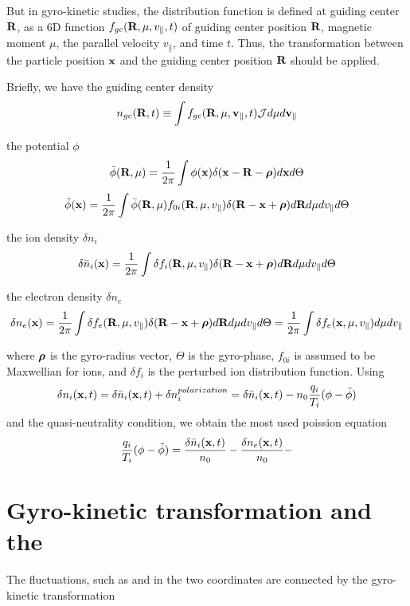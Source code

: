 \documentclass{report}
\newcommand{\bm}[1]{\mbox{\boldmath $#1$}}
\newcommand{\ff}[2]{\frac{#1}{#2}}
\def\R{\mbox{\bf R}}
\def\v{\mbox{\bf v}}
\def\x{\mbox{\bf x}}
\begin{document}
But in gyro-kinetic studies,
the distribution function is defined at guiding center $\R$, as a 6D function
$f_{gc}(\R, \mu, v_\parallel, t)$
of guiding center position $\R$, 
magnetic moment $\mu$, 
the parallel velocity $v_\parallel$,
and time $t$.
Thus, the transformation
between the particle position $\x$ and the guiding center position $\R$
should be applied.

\noindent
Briefly, we have the guiding center density
$$
n_{gc}(\R, t) \equiv \int f_{gc}(\R, \mu, \v_\parallel, t) \mathcal{J} d\mu d\v_\parallel
$$

\noindent
the potential $\phi$
$$
\bar{\phi}(\R, \mu)=\ff{1}{2\pi} \int \phi(\x) \delta(\x - \R - \bm{\rho}) d\x d\Theta
$$
$$
\tilde{\phi}(\x) = \ff{1}{2\pi} \int \bar{\phi}(\R, \mu) f_{0i}(\R, \mu, v_\parallel)
\delta(\R - \x + \bm{\rho}) d\R d\mu dv_\parallel d\Theta
$$

\noindent
the ion density $\delta n_i$
$$
\delta \bar{n}_i(\x) = \ff{1}{2\pi} \int
\delta f_i(\R, \mu, v_\parallel) \delta(\R - \x + \bm{\rho}) d\R d\mu dv_\parallel d\Theta
$$

\noindent
the electron density $\delta n_e$
$$
\delta n_e(\x) = \ff{1}{2\pi} \int
\delta f_e(\R, \mu, v_\parallel) \delta(\R - \x + \bm{\rho}) d\R d\mu dv_\parallel d\Theta
 = \ff{1}{2\pi} \int
\delta f_e(\x, \mu, v_\parallel) d\mu dv_\parallel
$$

\noindent
where $\bm{\rho}$ is the gyro-radius vector,
$\Theta$ is the gyro-phase,
$f_{0i}$ is assumed to be Maxwellian for ions,
and $\delta f_i$ is the perturbed ion distribution function.
Using 
$$
\delta n_i(\x, t) 
= \delta \bar{n}_i(\x, t) + \delta n_i^{polarization}
= \delta \bar{n}_i(\x, t) - n_0 \ff{q_i}{T_i} (\phi - \tilde{\phi})
$$
and the quasi-neutrality condition, we obtain the most used poission equation
\begin{equation}
\label{eq:1a}
\ff{q_i}{T_i} (\phi - \tilde{\phi})
= \ff{\delta \bar{n}_i(\x, t) }{ n_0 } -
  \ff{\delta n_e(\x, t) }{ n_0 } -
\end{equation}



\iffalse
\section{Gyro-kinetic transformation and the }

The fluctuations, such as  and 
in the two coordinates are connected by the gyro-kinetic transformation
\end{document}
